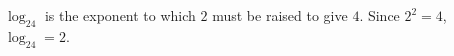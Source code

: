$\log_24$ is the exponent to which $2$ must be raised to give $4$. Since $2^2=4$, $\log_24=\boxed{2}$.
